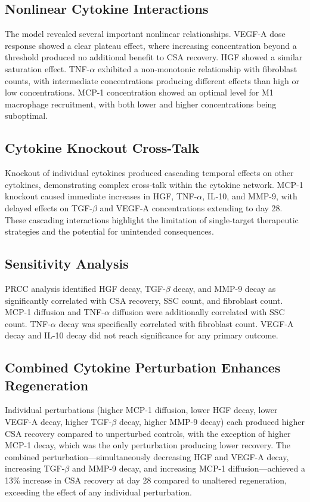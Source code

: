 \documentclass[11pt]{article}
\begin{document}
\subsection{Nonlinear Cytokine Interactions}

The model revealed several important nonlinear relationships. VEGF-A dose response showed a clear plateau effect, where increasing concentration beyond a threshold produced no additional benefit to CSA recovery. HGF showed a similar saturation effect. TNF-$\alpha$ exhibited a non-monotonic relationship with fibroblast counts, with intermediate concentrations producing different effects than high or low concentrations. MCP-1 concentration showed an optimal level for M1 macrophage recruitment, with both lower and higher concentrations being suboptimal.

\subsection{Cytokine Knockout Cross-Talk}

Knockout of individual cytokines produced cascading temporal effects on other cytokines, demonstrating complex cross-talk within the cytokine network. MCP-1 knockout caused immediate increases in HGF, TNF-$\alpha$, IL-10, and MMP-9, with delayed effects on TGF-$\beta$ and VEGF-A concentrations extending to day 28. These cascading interactions highlight the limitation of single-target therapeutic strategies and the potential for unintended consequences.

\subsection{Sensitivity Analysis}

PRCC analysis identified HGF decay, TGF-$\beta$ decay, and MMP-9 decay as significantly correlated with CSA recovery, SSC count, and fibroblast count. MCP-1 diffusion and TNF-$\alpha$ diffusion were additionally correlated with SSC count. TNF-$\alpha$ decay was specifically correlated with fibroblast count. VEGF-A decay and IL-10 decay did not reach significance for any primary outcome.

\subsection{Combined Cytokine Perturbation Enhances Regeneration}

Individual perturbations (higher MCP-1 diffusion, lower HGF decay, lower VEGF-A decay, higher TGF-$\beta$ decay, higher MMP-9 decay) each produced higher CSA recovery compared to unperturbed controls, with the exception of higher MCP-1 decay, which was the only perturbation producing lower recovery. The combined perturbation---simultaneously decreasing HGF and VEGF-A decay, increasing TGF-$\beta$ and MMP-9 decay, and increasing MCP-1 diffusion---achieved a 13\% increase in CSA recovery at day 28 compared to unaltered regeneration, exceeding the effect of any individual perturbation.
\end{document}
